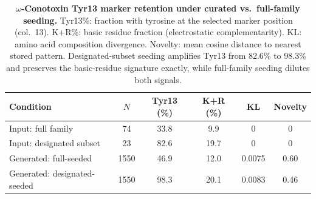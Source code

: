 \documentclass[journal=jcisd8,manuscript=article]{achemso}
\theoremstyle{definition}
\theoremstyle{remark}
\begin{document}
\begin{table}[p]
  \centering
  \caption{\textbf{$\omega$-Conotoxin Tyr13 marker retention under curated vs.\
  full-family seeding.}
  Tyr13\%: fraction with tyrosine at the selected marker position (col.~13).
  K+R\%: basic residue fraction (electrostatic complementarity). KL: amino acid composition
  divergence. Novelty: mean cosine distance to nearest stored pattern. Designated-subset seeding
  amplifies Tyr13 from 82.6\% to 98.3\% and preserves the basic-residue signature exactly,
  while full-family seeding dilutes both signals.}
  \label{tab:conotoxin-pharmacophore}
  \small
  \begin{tabular}{lccccc}
    \toprule
    Condition & $N$ & Tyr13 (\%) & K+R (\%) & KL & Novelty \\
    \midrule
    Input: full family          &   74 & 33.8 &  9.9 & 0      & 0 \\
    Input: designated subset    &   23 & 82.6 & 19.7 & 0      & 0 \\
    Generated: full-seeded      & 1550 & 46.9 & 12.0 & 0.0075 & 0.60 \\
    Generated: designated-seeded & 1550 & 98.3 & 20.1 & 0.0083 & 0.46 \\
    \bottomrule
  \end{tabular}
\end{table}
\end{document}
